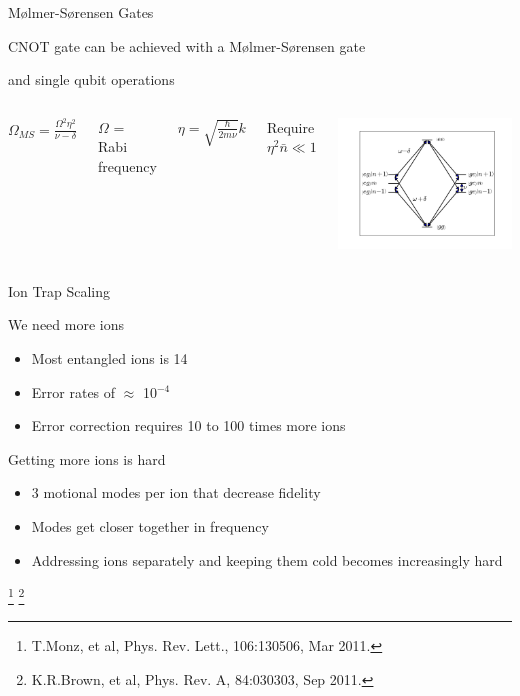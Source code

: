 \documentclass{beamer}
\begin{document}
\begin{frame}{M\o{}lmer-S\o{}rensen Gates}
\centerline{CNOT gate can be achieved with a M\o{}lmer-S\o{}rensen gate}
\centerline{and single qubit operations}
\begin{columns}[c]
	\centerline{$\Omega_{MS} = \frac{\Omega^2 \eta^2}{ \nu - \delta }$} 
	\hfill \break
	\centerline{$\Omega$ = Rabi frequency}
	\centerline{$\eta = \sqrt{ \frac{\hbar}{2 m \nu} } k$} 
	\hfill \break
	\centerline{Require $\eta^2 \bar{n} \ll 1$}
	\centerline{\includegraphics[height=0.7\textheight]{MolmerSorensen}}
\end{columns}
\end{frame}

\begin{frame}{Ion Trap Scaling}
	\centerline{\Large We need more ions}
	\begin{itemize}
		\item Most entangled ions is 14
		\item Error rates of $\approx$ 10$^{-4}$
		\item Error correction requires 10 to 100 times more ions
	\end{itemize}
	\vfill
	\centerline{\Large Getting more ions is hard}
	\begin{itemize}
		\item 3 motional modes per ion that decrease fidelity
		\item Modes get closer together in frequency
		\item Addressing ions separately and keeping them cold becomes increasingly hard
	\end{itemize}
\let\thefootnote\relax\footnote[frame]{T.Monz, et al, Phys. Rev. Lett., 106:130506, Mar 2011.}
\let\thefootnote\relax\footnote[frame]{K.R.Brown, et al, Phys. Rev. A, 84:030303, Sep 2011.}
\end{frame}
\end{document}
